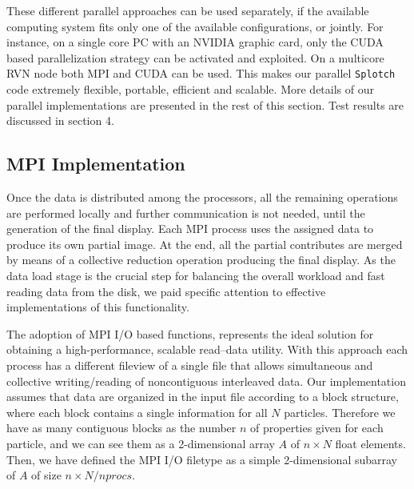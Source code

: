 These different parallel approaches can be used separately, 
if the available computing system fits only one of the available configurations, or jointly. 
For instance, on a single core PC with an NVIDIA graphic card, only the CUDA based 
parallelization strategy can be activated and exploited. On a multicore RVN \cite{rvn} 
node both MPI and CUDA can be used. This makes our parallel {\tt Splotch} code 
extremely flexible, portable, efficient and scalable. More details of our parallel implementations are presented in the rest of this section. Test results are discussed in section 4.

\subsection{MPI Implementation}
\label{mpi}

Once the data is distributed among the processors, all the remaining operations 
are performed locally and further communication is not needed, until the generation
of the final display. Each MPI process uses the assigned 
data to produce its own partial image. At the end, all the partial contributes are merged by means of a 
collective reduction operation producing the final display. As the data load stage is the crucial step for balancing the overall workload and fast reading 
data from the disk, we paid specific attention to effective implementations of this functionality.

The adoption of MPI I/O based functions, represents the ideal solution for obtaining 
a high-performance, scalable read--data utility. 
With this approach each process has a different fileview of a single file 
that allows simultaneous and collective
writing/reading of noncontiguous interleaved data. 
Our implementation assumes that data are organized in the input file according to a block structure, 
where each block contains a single information for 
all $N$ particles. Therefore we have as many contiguous blocks
as the number $n$ of properties given for each particle, and we can see them as a 2-dimensional array $A$ 
of $n \times N$ float elements. 
Then, we have defined the MPI I/O filetype as a simple 2-dimensional subarray of $A$ 
of size $n \times N/nprocs$.

